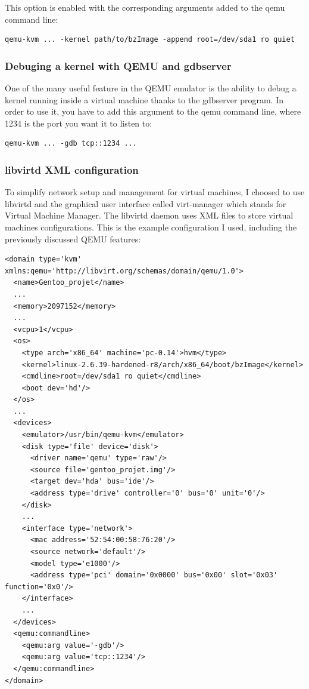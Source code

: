 \documentclass[pdftex,a4paper,titlepage,11pt]{article}
\begin{document}
This option is enabled with the corresponding arguments added to the qemu
command line:

\begin{lstlisting}
qemu-kvm ... -kernel path/to/bzImage -append root=/dev/sda1 ro quiet
\end{lstlisting}

\subsubsection{Debuging a kernel with QEMU and gdbserver}

One of the many useful feature in the QEMU emulator is the ability to debug a
kernel running inside a virtual machine thanks to the gdbserver program. In
order to use it, you have to add this argument to the qemu command line, where
1234 is the port you want it to listen to:

\begin{lstlisting}
qemu-kvm ... -gdb tcp::1234 ...
\end{lstlisting}

\subsubsection{libvirtd XML configuration}

To simplify network setup and management for virtual machines, I choosed to
use libvirtd and the graphical user interface called virt-manager which
stands for Virtual Machine Manager. The libvirtd daemon uses XML files to
store virtual machines configurations. This is the example configuration I used,
including the previously discussed QEMU features:

\begin{lstlisting}
<domain type='kvm' xmlns:qemu='http://libvirt.org/schemas/domain/qemu/1.0'>
  <name>Gentoo_projet</name>
  ...
  <memory>2097152</memory>
  ...
  <vcpu>1</vcpu>
  <os>
    <type arch='x86_64' machine='pc-0.14'>hvm</type>
    <kernel>linux-2.6.39-hardened-r8/arch/x86_64/boot/bzImage</kernel>
    <cmdline>root=/dev/sda1 ro quiet</cmdline>
    <boot dev='hd'/>
  </os>
  ...
  <devices>
    <emulator>/usr/bin/qemu-kvm</emulator>
    <disk type='file' device='disk'>
      <driver name='qemu' type='raw'/>
      <source file='gentoo_projet.img'/>
      <target dev='hda' bus='ide'/>
      <address type='drive' controller='0' bus='0' unit='0'/>
    </disk>
	...
    <interface type='network'>
      <mac address='52:54:00:58:76:20'/>
      <source network='default'/>
      <model type='e1000'/>
      <address type='pci' domain='0x0000' bus='0x00' slot='0x03' function='0x0'/>
    </interface>
	...
  </devices>
  <qemu:commandline>
    <qemu:arg value='-gdb'/>
    <qemu:arg value='tcp::1234'/>
  </qemu:commandline>
</domain>

\end{lstlisting}
\end{document}
